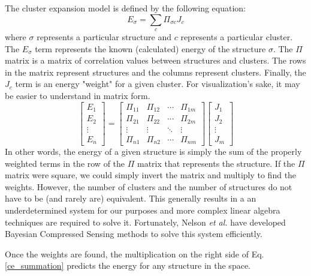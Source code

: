 \documentclass[oneside, noacknowlegments]{BYUPhys}
\begin{document}
The cluster expansion model is defined by the following equation:		
	\begin{equation} \label{ce_summation}
		E_{\sigma}=\sum_{c}{\Pi_{\sigma c}J_{c}} 
	\end{equation}
where $\sigma$ represents a particular structure and $c$ represents 
a particular cluster. The $E_{\sigma}$ term represents the known 
(calculated) energy of the structure $\sigma$. The $\Pi$ matrix is 
a matrix of correlation values between structures and clusters. The 
rows in the matrix represent structures and the columns represent 
clusters. Finally, the $J_c$ term is an energy "weight" for a given 
cluster. For visualization's sake, it may be easier to understand 
in matrix form.
	\begin{equation} \label{ce_matrix}
		\begin{bmatrix}
			E_1 \\
			E_2 \\
			\vdots \\
			E_n
		\end{bmatrix}
		=
		\begin{bmatrix}
			\Pi_{11} & \Pi_{12} & \cdots & \Pi_{1m} \\
			\Pi_{21} & \Pi_{22} & \cdots & \Pi_{2m} \\
			\vdots   & \vdots   & \ddots & \vdots \\
			\Pi_{n1} & \Pi_{n2} & \cdots & \Pi_{nm}
		\end{bmatrix}
		\begin{bmatrix}
			J_1 \\
			J_2 \\
			\vdots \\
			J_m
		\end{bmatrix}
	\end{equation}
In other words, the energy of a given structure is simply the sum 
of the properly weighted terms in the row of the $\Pi$ matrix that 
represents the structure. If the $\Pi$ matrix were square, we could 
simply invert the matrix and multiply to find the weights. However, 
the number of clusters and the number of structures do not have to 
be (and rarely are) equivalent. This generally results in a an 
underdetermined system for our purposes and more complex linear 
algebra techniques are required to solve it. Fortunately, Nelson 
\textit{et al.} have developed Bayesian Compressed Sensing methods 
to solve this system efficiently.~\cite{NelsonCE}

Once the weights are found, the multiplication on the right side of 
Eq. \ref{ce_summation} predicts the energy for any structure in the 
space.
\end{document}
